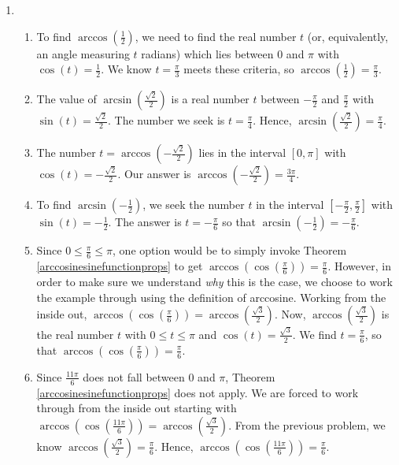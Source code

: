 {
\begin{enumerate}

\item 

\begin{enumerate}

\item  To find $\arccos\left(\frac{1}{2}\right)$, we need to find the real number $t$ (or, equivalently, an angle measuring $t$ radians) which lies between $0$ and $\pi$ with $\cos(t) = \frac{1}{2}$. We know $t = \frac{\pi}{3}$ meets these criteria, so $\arccos\left(\frac{1}{2}\right)= \frac{\pi}{3}$.

\item  The value of $\arcsin\left(\frac{\sqrt{2}}{2}\right)$ is a real number $t$ between $-\frac{\pi}{2}$ and $\frac{\pi}{2}$ with $\sin(t) = \frac{\sqrt{2}}{2}$.  The number we seek is  $t = \frac{\pi}{4}$. Hence, $\arcsin\left(\frac{\sqrt{2}}{2}\right) = \frac{\pi}{4}$.

\item  The number $t = \arccos\left(-\frac{\sqrt{2}}{2}\right)$ lies in the interval $[0,\pi]$ with $\cos(t) = -\frac{\sqrt{2}}{2}$.  Our answer is $\arccos\left(-\frac{\sqrt{2}}{2}\right) = \frac{3\pi}{4}$.

\item  To find  $\arcsin\left(-\frac{1}{2}\right)$, we seek the number $t$ in the interval $\left[-\frac{\pi}{2}, \frac{\pi}{2}\right]$ with $\sin(t) = -\frac{1}{2}$.  The answer is $t = -\frac{\pi}{6}$ so that $\arcsin\left(-\frac{1}{2}\right) = -\frac{\pi}{6}$.

\item  Since $0 \leq \frac{\pi}{6} \leq \pi$, one option would be to simply invoke Theorem \ref{arccosinesinefunctionprops} to get $\arccos\left( \cos\left(\frac{\pi}{6}\right)\right) = \frac{\pi}{6}$.  However, in order to make sure we understand \textit{why} this is the case, we choose to work the example through using the definition of arccosine.  Working from the inside out,  $\arccos\left( \cos\left(\frac{\pi}{6}\right)\right) = \arccos\left( \frac{\sqrt{3}}{2}\right)$.  Now, $\arccos\left( \frac{\sqrt{3}}{2}\right)$ is the real number $t$ with $0 \leq t \leq \pi$ and $\cos(t) = \frac{\sqrt{3}}{2}$.  We find $t = \frac{\pi}{6}$, so that  $\arccos\left( \cos\left(\frac{\pi}{6}\right)\right) = \frac{\pi}{6}$.

\item Since $\frac{11\pi}{6}$ does not fall between $0$ and $\pi$, Theorem \ref{arccosinesinefunctionprops} does not apply.  We are forced to work through from the inside out starting with  $\arccos\left( \cos\left(\frac{11\pi}{6}\right)\right) = \arccos\left(\frac{\sqrt{3}}{2}\right)$.  From the previous problem, we know $\arccos\left(\frac{\sqrt{3}}{2}\right) = \frac{\pi}{6}$.  Hence,  $\arccos\left( \cos\left(\frac{11\pi}{6}\right)\right) = \frac{\pi}{6}$.


\end{enumerate}
\end{enumerate}}
